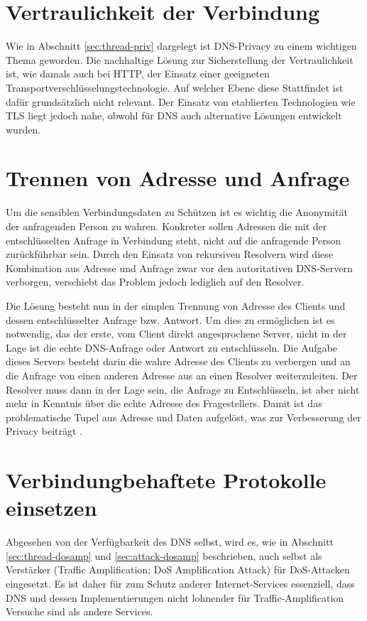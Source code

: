 \section{Vertraulichkeit der Verbindung}
Wie in Abschnitt \ref{sec:thread-priv} dargelegt ist DNS-Privacy zu einem wichtigen Thema geworden. Die nachhaltige Lösung zur Sicherstellung der Vertraulichkeit ist, wie damals auch bei HTTP, der Einsatz einer geeigneten Transportverschlüsselungstechnologie. Auf welcher Ebene diese Stattfindet ist dafür grundsätzlich nicht relevant. Der Einsatz von etablierten Technologien wie TLS liegt jedoch nahe, obwohl für DNS auch alternative Lösungen entwickelt wurden. 


\section{Trennen von Adresse und Anfrage}
\label{sec:goals-sourceanon}
Um die sensiblen Verbindungsdaten zu Schützen ist es wichtig die Anonymität der anfragenden Person zu wahren. Konkreter sollen Adressen die mit der entschlüsselten Anfrage in Verbindung steht, nicht auf die anfragende Person zurückführbar sein. Durch den Einsatz von rekursiven Resolvern wird diese Kombination aus Adresse und Anfrage zwar vor den autoritativen DNS-Servern verborgen, verschiebt das Problem jedoch lediglich auf den Resolver. 

Die Lösung besteht nun in der simplen Trennung von Adresse des Clients und dessen entschlüsselter Anfrage bzw. Antwort. Um dies zu ermöglichen ist es notwendig, das der erste, vom Client direkt angesprochene Server, nicht in der Lage ist die echte DNS-Anfrage oder Antwort zu entschlüsseln. Die Aufgabe dieses Servers besteht darin die wahre Adresse des Clients zu verbergen und an die Anfrage von einen anderen Adresse aus an einen Resolver weiterzuleiten. Der Resolver muss dann in der Lage sein, die Anfrage zu Entschlüsseln, ist aber nicht mehr in Kenntnis über die echte Adresse des Fragestellers. Damit ist das problematische Tupel aus Adresse und Daten aufgelöst, was zur Verbesserung der Privacy beiträgt \cite{Schmitt2018}.

\section{Verbindungbehaftete Protokolle einsetzen}
\label{sec:goals-trafficamp}
Abgesehen von der Verfügbarkeit des DNS selbst, wird es, wie in Abschnitt \ref{sec:thread-dosamp} und \ref{sec:attack-dosamp} beschrieben, auch selbst als Verstärker (Traffic Amplification; DoS Amplification Attack) für DoS-Attacken eingesetzt. Es ist daher für zum Schutz anderer Internet-Services essenziell, dass DNS und dessen Implementierungen nicht lohnender für Traffic-Amplification Versuche sind als andere Services.

